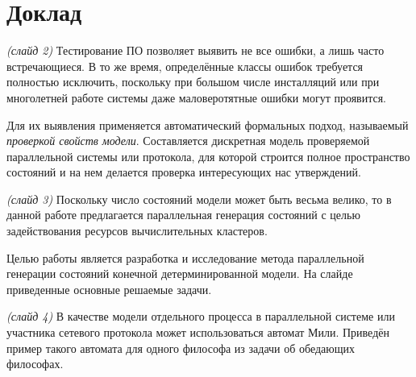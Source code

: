 \documentclass[a4paper,12pt,notitlepage]{article}
\begin{document}
\section{Доклад}



\emph{(слайд 2)} Тестирование ПО позволяет выявить не все ошибки, а лишь часто
встречающиеся. В то же время, определённые классы ошибок требуется полностью исключить,
поскольку при большом числе инсталляций или при многолетней работе системы даже
маловеротятные ошибки могут проявится.

Для их выявления применяется автоматический формальных подход, называемый \emph{проверкой
  свойств модели}. Составляется дискретная модель проверяемой параллельной системы или
протокола, для которой строится полное пространство состояний и на нем делается проверка
интересующих нас утверждений.

\emph{(слайд 3)} Поскольку число состояний модели может быть весьма велико, то в данной
работе предлагается параллельная генерация состояний с целью задействования ресурсов
вычислительных кластеров.

Целью работы является разработка и исследование метода параллельной генерации состояний
конечной детерминированной модели. На слайде приведенные основные решаемые задачи.

\emph{(слайд 4)} В качестве модели отдельного процесса в параллельной системе или
участника сетевого протокола может использоваться автомат Мили. Приведён пример такого
автомата для одного философа из задачи об обедающих философах.


\end{document}
